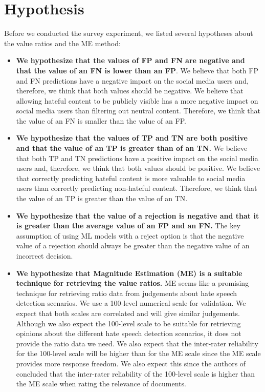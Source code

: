 \section{Hypothesis}
\label{sec:survey-hypothesis}
Before we conducted the survey experiment, we listed several hypotheses about the value ratios and the ME method:
\begin{itemize}
    \item \textbf{We hypothesize that the values of FP and FN are negative and that the value of an FN is lower than an FP}. We believe that both FP and FN predictions have a negative impact on the social media users and, therefore, we think that both values should be negative. We believe that allowing hateful content to be publicly visible has a more negative impact on social media users than filtering out neutral content. Therefore, we think that the value of an FN is smaller than the value of an FP.
    \item \textbf{We hypothesize that the values of TP and TN are both positive and that the value of an TP is greater than of an TN.} We believe that both TP and TN predictions have a positive impact on the social media users and, therefore, we think that both values should be positive. We believe that correctly predicting hateful content is more valuable to social media users than correctly predicting non-hateful content. Therefore, we think that the value of an TP is greater than the value of an TN.
    \item \textbf{We hypothesize that the value of a rejection is negative and that it is greater than the average value of an FP and an FN.} The key assumption of using ML models with a reject option is that the negative value of a rejection should always be greater than the negative value of an incorrect decision.
    \item \textbf{We hypothesize that Magnitude Estimation (ME) is a suitable technique for retrieving the value ratios.} ME seems like a promising technique for retrieving ratio data from judgements about hate speech detection scenarios. We use a 100-level numerical scale for validation. We expect that both scales are correlated and will give similar judgements. Although we also expect the 100-level scale to be suitable for retrieving opinions about the different hate speech detection scenarios, it does not provide the ratio data we need. We also expect that the inter-rater reliability for the 100-level scale will be higher than for the ME scale since the ME scale provides more response freedom. We also expect this since the authors of \cite{roitero2018fine} concluded that the inter-rater reliability of the 100-level scale is higher than the ME scale when rating the relevance of documents.
\end{itemize}


